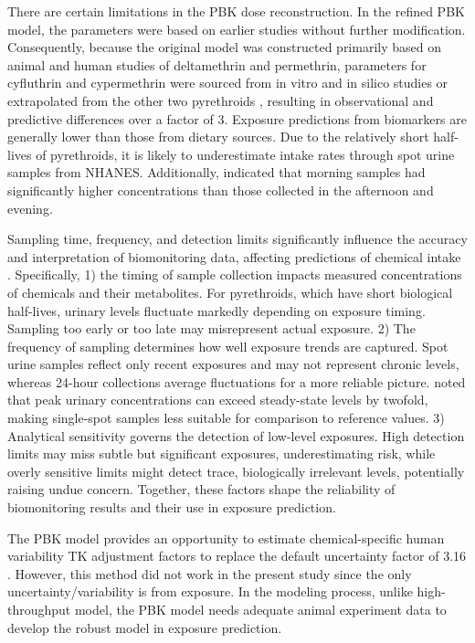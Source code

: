 \documentclass[toxics,article,submit,pdftex,moreauthors]{Definitions/mdpi}
\begin{document}
There are certain limitations in the PBK dose reconstruction. In the
refined PBK model, the parameters were based on earlier studies without
further modification. Consequently, because the original model was
constructed primarily based on animal and human studies of deltamethrin
and permethrin, parameters for cyfluthrin and cypermethrin were sourced
from in vitro and in silico studies or extrapolated from the other two
pyrethroids \citep{quindroit2019estimating}, resulting in observational
and predictive differences over a factor of 3. Exposure predictions from
biomarkers are generally lower than those from dietary sources. Due to
the relatively short half-lives of pyrethroids, it is likely to
underestimate intake rates through spot urine samples from NHANES.
Additionally, \citet{barr2010urinary} indicated that morning samples had
significantly higher concentrations than those collected in the
afternoon and evening. 

Sampling time, frequency, and detection limits significantly influence the
accuracy and interpretation of biomonitoring data, affecting predictions of
chemical intake \citep{hays2007biomonitoring}. Specifically, 1) the timing of
sample collection impacts measured concentrations of chemicals and their
metabolites. For pyrethroids, which have short biological half-lives, urinary
levels fluctuate markedly depending on exposure timing. Sampling too early or
too late may misrepresent actual exposure. 2) The frequency of sampling
determines how well exposure trends are captured. Spot urine samples reflect
only recent exposures and may not represent chronic levels, whereas 24-hour
collections average fluctuations for a more reliable picture.
\citet{hays2007biomonitoring} noted that peak urinary concentrations can exceed
steady-state levels by twofold, making single-spot samples less suitable for
comparison to reference values. 3) Analytical sensitivity governs the detection
of low-level exposures. High detection limits may miss subtle but significant
exposures, underestimating risk, while overly sensitive limits might detect
trace, biologically irrelevant levels, potentially raising undue concern.
Together, these factors shape the reliability of biomonitoring results and
their use in exposure prediction.

The PBK model provides an opportunity to estimate chemical-specific human
variability TK adjustment factors to replace the default uncertainty factor of
3.16 \citep{chiu_advancing_2018}. However, this method did not work in the
present study since the only uncertainty/variability is from exposure. In the
modeling process, unlike high-throughput model, the PBK model needs adequate
animal experiment data to develop the robust model in exposure prediction.
\end{document}
